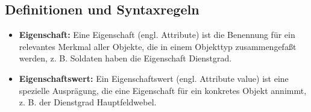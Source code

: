       \subsection{Definitionen und Syntaxregeln}
        \begin{merke}
          \begin{itemize}
            \item \textbf{Eigenschaft:} Eine Eigenschaft (engl. Attribute) ist
            die Benennung für ein relevantes Merkmal aller Objekte, die in
            einem Objekttyp zusammengefaßt werden, z. B. Soldaten haben die
            Eigenschaft Dienstgrad.
            \item \textbf{Eigenschaftswert:} Ein Eigenschaftswert (engl.
            Attribute value) ist eine spezielle Ausprägung, die eine
            Eigenschaft für ein konkretes Objekt annimmt, z. B. der Dienstgrad
            Hauptfeldwebel.
          \end{itemize}
          \end{merke}

